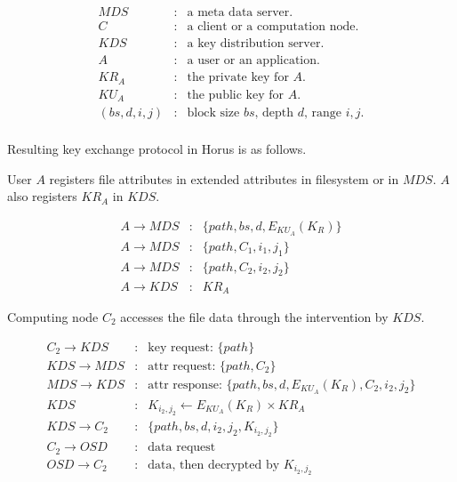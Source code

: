 \documentclass[11pt]{article}
\newcommand{\mds}{\ensuremath{\mathit{MDS}}}
\newcommand{\kds}{\ensuremath{\mathit{KDS}}}
\newcommand{\osd}{\ensuremath{\mathit{OSD}}}
\begin{document}
\begin{eqnarray*}
   \mds & : & \mbox{a meta data server.} \\
   C    & : & \mbox{a client or a computation node.} \\
   \kds & : & \mbox{a key distribution server.} \\
   A    & : & \mbox{a user or an application.} \\
   \textit{KR}_A & : & \mbox{the private key for $A$.} \\
   \textit{KU}_A & : & \mbox{the public key for $A$.} \\
   (bs,d,i,j) & : & \mbox{block size $bs$, depth $d$, range $i,j$.} \\
\end{eqnarray*}

\clearpage

Resulting key exchange protocol in Horus is as follows.

User $A$ registers file attributes in extended attributes
in filesystem or in $\mds$. $A$ also registers $KR_A$ in $\kds$.

\begin{eqnarray}
A \rightarrow \mds & : & \{ path, bs, d, E_{KU_A}(K_R) \} \\
A \rightarrow \mds & : & \{ path, C_1, i_1, j_1 \} \\
A \rightarrow \mds & : & \{ path, C_2, i_2, j_2 \} \\
A \rightarrow \kds & : & KR_A
\end{eqnarray}

Computing node $C_2$ accesses the file data through the intervention
by $\kds$.

\begin{eqnarray}
C_2 \rightarrow \kds & : & \mbox{key request: } \{ path \} \\
\kds \rightarrow \mds & : & \mbox{attr request: } \{ path,C_2 \} \\
\mds \rightarrow \kds & : & \mbox{attr response: } \{ path,bs,d,E_{KU_A}(K_R),C_2,i_2,j_2 \} \\
\kds         & : & K_{i_2,j_2} \leftarrow E_{KU_A}(K_R) \times KR_A \\
\kds \rightarrow C_2 & : & \{ path, bs, d, i_2, j_2, K_{i_2,j_2} \} \\
C_2 \rightarrow \osd & : & \mbox{data request} \\
\osd \rightarrow C_2 & : & \mbox{data, then decrypted by } K_{i_2,j_2}
\end{eqnarray}
\end{document}
